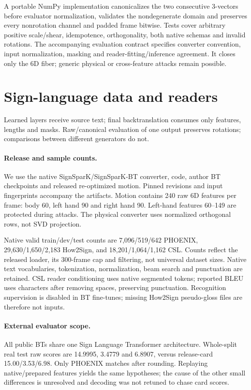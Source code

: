 \documentclass[10pt,twocolumn,letterpaper]{article}
\begin{document}
A portable NumPy implementation canonicalizes the two consecutive 3-vectors before evaluator normalization, validates the nondegenerate domain and preserves every nonrotation channel and padded frame bitwise. Tests cover arbitrary positive scale/shear, idempotence, orthogonality, both native schemas and invalid rotations. The accompanying evaluation contract specifies converter convention, input normalization, masking and reader-fitting/inference agreement. It closes only the 6D fiber; generic physical or cross-feature attacks remain possible.


\section{Sign-language data and readers}
Learned layers receive source text; final backtranslation consumes only features, lengths and masks. Raw/canonical evaluation of one output preserves rotations; comparisons between different generators do not.

\paragraph{Release and sample counts.}
We use the native SignSparK/SignSparK-BT converter, code, author BT checkpoints and released re-optimized motion. Pinned revisions and input fingerprints accompany the artifacts. Motion contains 240 raw 6D features per frame: body 60, left hand 90 and right hand 90. Left-hand features 60--149 are protected during attacks. The physical converter uses normalized orthogonal rows, not SVD projection.

Native valid train/dev/test counts are 7,096/519/642 PHOENIX, 29,630/1,650/2,183 How2Sign, and 18,201/1,064/1,162 CSL. Counts reflect the released loader, its 300-frame cap and filtering, not universal dataset sizes. Native text vocabularies, tokenization, normalization, beam search and punctuation are retained. CSL reader conditioning uses native segmented tokens; reported BLEU uses characters after removing spaces, preserving punctuation. Recognition supervision is disabled in BT fine-tunes; missing How2Sign pseudo-gloss files are therefore not inputs.

\paragraph{External evaluator scope.}
All public BTs share one Sign Language Transformer architecture. Whole-split real test raw scores are 14.9995, 3.4779 and 6.8907, versus release-card 15.00/3.53/6.98. Only PHOENIX matches after rounding. Replaying native/prepared features yields the same hypotheses; the cause of the other small differences is unresolved and decoding was not retuned to chase card scores.
\end{document}
